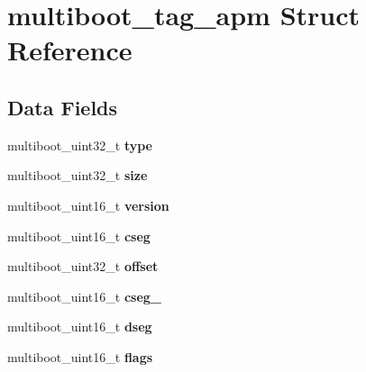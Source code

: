 \hypertarget{structmultiboot__tag__apm}{}\section{multiboot\+\_\+tag\+\_\+apm Struct Reference}
\label{structmultiboot__tag__apm}
\subsection*{Data Fields}
\begin{DoxyCompactItemize}
\item 
multiboot\+\_\+uint32\+\_\+t {\bfseries type}\hypertarget{structmultiboot__tag__apm_a7a28a2d525d43caef08e4cd02de6d318}{}\label{structmultiboot__tag__apm_a7a28a2d525d43caef08e4cd02de6d318}

\item 
multiboot\+\_\+uint32\+\_\+t {\bfseries size}\hypertarget{structmultiboot__tag__apm_a56a7da386ccd0c46607547495a67097f}{}\label{structmultiboot__tag__apm_a56a7da386ccd0c46607547495a67097f}

\item 
multiboot\+\_\+uint16\+\_\+t {\bfseries version}\hypertarget{structmultiboot__tag__apm_a9062cb77271b7ed69970ede5c90a50ad}{}\label{structmultiboot__tag__apm_a9062cb77271b7ed69970ede5c90a50ad}

\item 
multiboot\+\_\+uint16\+\_\+t {\bfseries cseg}\hypertarget{structmultiboot__tag__apm_ac2109f74c95e62b0c3e7b74f9e2e5725}{}\label{structmultiboot__tag__apm_ac2109f74c95e62b0c3e7b74f9e2e5725}

\item 
multiboot\+\_\+uint32\+\_\+t {\bfseries offset}\hypertarget{structmultiboot__tag__apm_ae9d788171dfbf0f540c37aee20c96eb3}{}\label{structmultiboot__tag__apm_ae9d788171dfbf0f540c37aee20c96eb3}

\item 
multiboot\+\_\+uint16\+\_\+t {\bfseries cseg\+\_}\hypertarget{structmultiboot__tag__apm_ae10031b73878b35c3fd332193293fd6d}{}\label{structmultiboot__tag__apm_ae10031b73878b35c3fd332193293fd6d}

\item 
multiboot\+\_\+uint16\+\_\+t {\bfseries dseg}\hypertarget{structmultiboot__tag__apm_a0f8ff7cd97ae788d8afcd7dee881367a}{}\label{structmultiboot__tag__apm_a0f8ff7cd97ae788d8afcd7dee881367a}

\item 
multiboot\+\_\+uint16\+\_\+t {\bfseries flags}\hypertarget{structmultiboot__tag__apm_aa17117ffd2816687bff2c99ecd73bd29}{}\label{structmultiboot__tag__apm_aa17117ffd2816687bff2c99ecd73bd29}


\end{DoxyCompactItemize}
